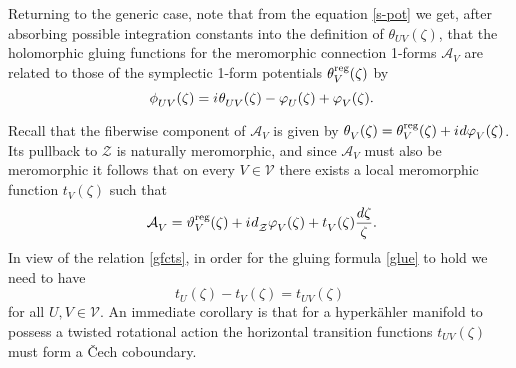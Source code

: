 \documentclass[11pt]{amsart}
\theoremstyle{remark}
\theoremstyle{remark}
\theoremstyle{definition}
\theoremstyle{definition}
\theoremstyle{definition}
\newcommand{\0}{{\scriptstyle 0'}} %
\newcommand{\1}{{\scriptstyle 1'}}
\newcommand{\hp}{\hspace{0.5pt}} %
\begin{document}
\subsubsection{}


Returning to the generic case, note that from the equation \eqref{s-pot} we get, after absorbing possible integration constants into the definition of $\theta_{UV}(\zeta)$, that the holomorphic gluing functions for the meromorphic connection 1-forms $\mathcal{A}_V$ are related to those of the symplectic 1-form potentials $\theta^{\textup{reg}}_V(\zeta)$ by  
\begin{equation} \label{gfcts}
\phi^{\phantom{g}}_{UV}(\zeta) =  i \hp \theta^{\phantom{g}}_{UV}(\zeta) - \varphi^{\phantom{g}}_U(\zeta) + \varphi^{\phantom{g}}_V(\zeta) \rlap{.}
\end{equation}

Recall that the fiberwise component of $\mathcal{A}_V$ is given by $\smash[b]{ \theta^{\phantom{g}}_V(\zeta) = \theta^{\text{reg}}_V(\zeta) + i \hp d\varphi^{\phantom{g}}_V(\zeta) }$. Its pullback to $\mathcal{Z}$ is naturally meromorphic, and since $\mathcal{A}_V$ must also be meromorphic it follows that on every $V \in \mathscr{V}$ there exists a local meromorphic function $t^{\phantom{g}}_V(\zeta)$ such that
\begin{equation} \label{A_V-too}
\mathcal{A}^{\phantom{g}}_V = \vartheta^{\text{reg}}_V(\zeta) + i\hp d^{\phantom{g}}_{\mathcal{Z}}\varphi^{\phantom{g}}_V(\zeta) + t^{\phantom{g}}_V(\zeta) \frac{d\zeta}{\zeta} \rlap{.}
\end{equation}
In view of the relation \eqref{gfcts}, in order for the gluing formula \eqref{glue} to hold we need to have
\begin{equation} \label{Cech-bndry}
t_U(\zeta) - t_V(\zeta) = t_{UV}(\zeta)
\end{equation}
for all $U,V \in \mathscr{V}$. An immediate corollary is that for a hyperk\"ahler manifold to possess a twisted rotational action the horizontal transition functions $t_{UV}(\zeta)$ must form a \v{C}ech coboundary. 
\end{document}
